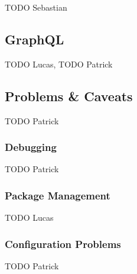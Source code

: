 TODO Sebastian

\subsection{GraphQL}
\label{ssec:graphql}

TODO Lucas, TODO Patrick

\subsection{Problems \& Caveats}
\label{ssec:problems}

TODO Patrick

\subsubsection{Debugging}
\label{sssec:debugging}

TODO Patrick

\subsubsection{Package Management}
\label{sssec:package_management}

TODO Lucas

\subsubsection{Configuration Problems}
\label{sssec:configuration_problems}

TODO Patrick